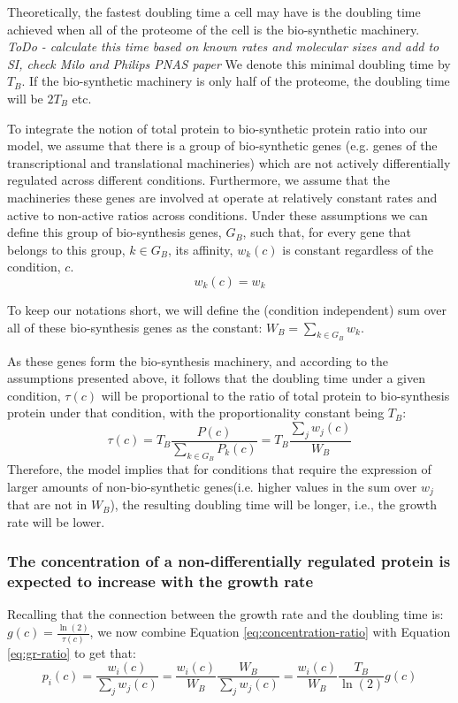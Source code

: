 \documentclass[notitlepage]{article}
\begin{document}
Theoretically, the fastest doubling time a cell may have is the doubling time achieved when all of the proteome of the cell is the bio-synthetic machinery.
\emph{ToDo - calculate this time based on known rates and molecular sizes and add to SI, check Milo and Philips PNAS paper}
We denote this minimal doubling time by $T_B$.
If the bio-synthetic machinery is only half of the proteome, the doubling time will be $2T_B$ etc.

To integrate the notion of total protein to bio-synthetic protein ratio into our model, we assume that there is a group of bio-synthetic genes (e.g. genes of the transcriptional and translational machineries) which are not actively differentially regulated across different conditions.
Furthermore, we assume that the machineries these genes are involved at operate at relatively constant rates and active to non-active ratios across conditions.
Under these assumptions we can define this group of bio-synthesis genes, $G_B$, such that, for every gene that belongs to this group, $k \in G_B$, its affinity, $w_k(c)$ is constant regardless of the condition, $c$.
\begin{equation}
  \label{eq:biosynth-def}
  w_k(c)=w_k
\end{equation}

To keep our notations short, we will define the (condition independent) sum over all of these bio-synthesis genes as the constant: $W_B = \sum_{k\in G_B}w_k$.

As these genes form the bio-synthesis machinery, and according to the assumptions presented above, it follows that the doubling time under a given condition, $\tau(c)$ will be proportional to the ratio of total protein to bio-synthesis protein under that condition, with the proportionality constant being $T_B$:
\begin{equation}
  \label{eq:gr-ratio}
  \tau(c) = T_B\frac{P(c)}{\sum_{k\in G_B}P_k(c)}=T_B\frac{\sum_jw_j(c)}{W_B}
\end{equation}
Therefore, the model implies that for conditions that require the expression of larger amounts of non-bio-synthetic genes(i.e. higher values in the sum over $w_j$ that are not in $W_B$), the resulting doubling time will be longer, i.e., the growth rate will be lower.

\subsubsection{The concentration of a non-differentially regulated protein is expected to increase with the growth rate} 
Recalling that the connection between the growth rate and the doubling time is: $g(c)=\frac{\ln(2)}{\tau(c)}$, we now combine Equation \ref{eq:concentration-ratio} with Equation \ref{eq:gr-ratio} to get that:
\begin{equation}
  \label{eq:default-response}
  p_i(c)=\frac{w_i(c)}{\sum_jw_j(c)}=\frac{w_i(c)}{W_B}\frac{W_B}{\sum_jw_j(c)}=\frac{w_i(c)}{W_B}\frac{T_B}{\ln(2)}g(c)
\end{equation}
\end{document}
